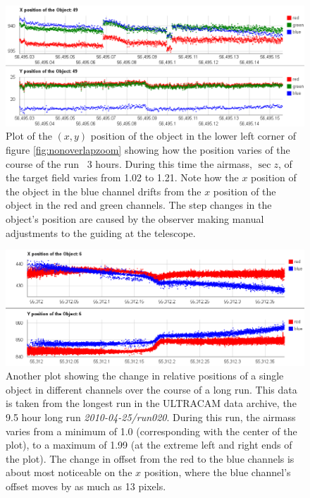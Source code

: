 \begin{figure}
  \centering
  \includegraphics[width=140mm]{images/position_drift.png}
  \caption{Plot of the $(x, y)$ position of the object in the lower left corner of figure \ref{fig:nonoverlapzoom} showing how the position varies of the course of the run ~3 hours. During this time the airmass, $\sec z$, of the target field varies from 1.02 to 1.21. Note how the $x$ position of the object in the blue channel drifts from the $x$ position of the object in the red and green channels. The step changes in the object's position are caused by the observer making manual adjustments to the guiding at the telescope. }
\label{fig:positiondrift}
\end{figure}

\begin{figure}
  \centering
  \includegraphics[width=140mm]{images/position_drift_longrun.png}
  \caption{Another plot showing the change in relative positions of a single object in different channels over the course of a long run. This data is taken from the longest run in the ULTRACAM data archive, the 9.5 hour long run \emph{2010-04-25/run020}. During this run, the airmass varies from a minimum of 1.0 (corresponding with the center of the plot), to a maximum of 1.99 (at the extreme left and right ends of the plot). The change in offset from the red to the blue channels is about most noticeable on the $x$ position, where the blue channel's offset moves by as much as 13 pixels. }
\label{fig:positiondriftlongrun}
\end{figure}

